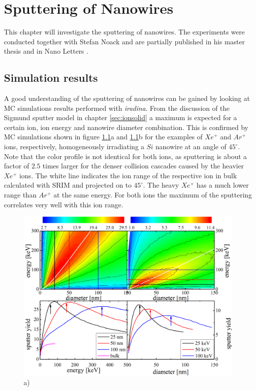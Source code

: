 \chapter{Sputtering of Nanowires}

This chapter will investigate the sputtering of nanowires. The experiments were conducted together with Stefan Noack and are partially published in his master thesis \cite{noack_sputter_2014} and in Nano Letters \cite{johannes_anomalous_2015}.




\section{Simulation results}
\label{sec:simsputering}

A good understanding of the sputtering of nanowires can be gained by looking at MC simulations results performed with \emph{iradina}. From the discussion of the Sigmund sputter model in chapter \ref{sec:ionsolid} a maximum is expected for a certain ion, ion energy and nanowire diameter combination. This is confirmed by MC simulations shown in figure \ref{sputtering_de}a and \ref{sputtering_de}b for the examples of $Xe^+$ and $Ar^+$ ions, respectively, homogeneously irradiating a $Si$ nanowire at an angle of $45^\circ$. Note that the color profile is not identical for both ions, as sputtering is about a factor of $2.5$ times larger for the denser collision cascades caused by the heavier $Xe^+$ ions. The white line indicates the ion range of the respective ion in bulk calculated with SRIM and projected on to $45^\circ$. The heavy $Xe^+$ has a much lower range than $Ar^+$ at the same energy. For both ions the maximum of the sputtering correlates very well with this ion range. 

\begin{figure}[th]
	\centering
		\includegraphics[width=.95\textwidth]{images/sputtering_diameter_energy.png}
	\caption{a) } 
	\label{sputtering_de}
\end{figure} 

